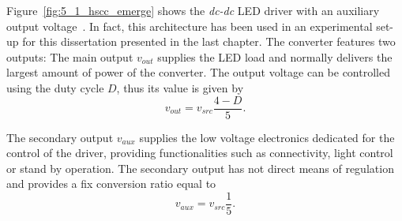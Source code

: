 Figure~\ref{fig:5_1_hscc_emerge} shows the \emph{dc-dc} LED driver with an auxiliary output voltage~\cite{WO2015/040564}.
In fact, this architecture has been used in an experimental set-up for this dissertation presented in the last chapter. The converter features two outputs: The main output $v_{out}$ supplies the LED load and normally delivers the largest amount of power of the converter. The output voltage can be controlled using the duty cycle $D$, thus its value is given by
\begin{equation}
v_{out} =  v_{src}  \frac{4 - D }{5}.
\label{eq:dc_dc_vout}
\end{equation}

The secondary output $v_{aux}$ supplies the low voltage electronics dedicated for the control of the driver, providing functionalities such as connectivity, light control or stand by operation. The secondary output has not direct means of regulation and provides a fix conversion ratio equal to
\begin{equation}
v_{aux} =  v_{src} \frac{1 }{5}.
\label{eq:dc_dc_vaux}
\end{equation}

